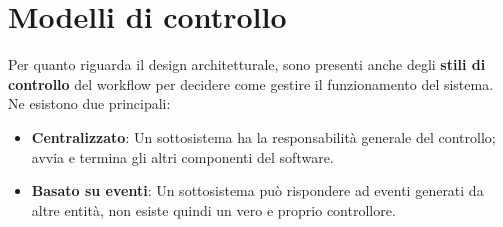 %

\section{Modelli di controllo}
Per quanto riguarda il design architetturale, sono presenti anche degli \textbf{stili di controllo} del workflow per decidere come gestire il
funzionamento del sistema. Ne esistono due principali: \begin{itemize}
	\item \textbf{Centralizzato}: Un sottosistema ha la responsabilità generale del controllo; avvia e termina gli altri componenti del software.
	\item \textbf{Basato su eventi}: Un sottosistema può rispondere ad eventi generati da altre entità, non esiste quindi un vero e proprio controllore.
\end{itemize}


